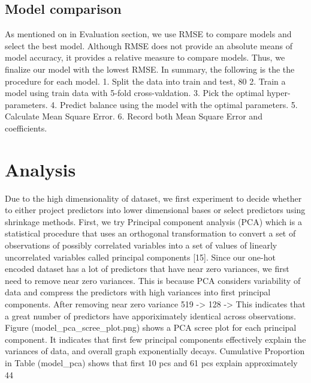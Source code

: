 \documentclass[a4paper]{article}
\begin{document}
\begin{flushleft}
\subsection{Model comparison}
As mentioned on in Evaluation section, we use RMSE to compare models and select the best model. Although RMSE does not provide an absolute means of model accuracy, it provides a relative measure to compare models. Thus, we finalize our model with the lowest RMSE.
In summary, the following is the the procedure for each model.
	1.	Split the data into train and test, 80%
	2.	Train a model using train data with 5-fold cross-valdation.
	3.	Pick the optimal hyper-parameters.
	4.	Predict balance using the model with the optimal parameters.
	5.	Calculate Mean Square Error.
	6.	Record both Mean Square Error and coefficients.


\section{Analysis}
Due to the high dimensionality of dataset, we first experiment to decide whether to either project predictors into lower dimensional bases or select predictors using shrinkage methods. First, we try Principal component analysis (PCA) which is a statistical procedure that uses an orthogonal transformation to convert a set of observations of possibly correlated variables into a set of values of linearly uncorrelated variables called principal components [15]. Since our one-hot encoded dataset has a lot of predictors that have near zero variances, we first need to remove near zero variances. This is because PCA considers variability of data and compress the predictors with high variances into first principal components.   After removing near zero variance 519 -> 128  -> This indicates that a great number of predictors have apporiximately identical across observations. Figure (model_pca_scree_plot.png) shows a PCA scree plot for each principal component. It indicates that first few principal components effectively explain the variances of data, and overall graph exponentially decays. Cumulative Proportion in Table (model_pca) shows that first 10 pcs and 61 pcs explain approximately 44%



\end{flushleft}
\end{document}
